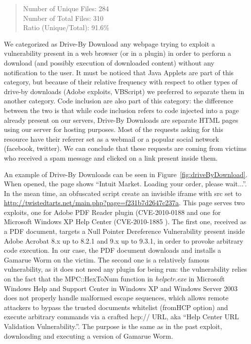 \begin{quote}
Number of Unique Files: 284\\
Number of Total Files: 310\\
Ratio (Unique/Total): 91.6\%
\end{quote}

We categorized as Drive-By Download any webpage trying to exploit a vulnerability present in a web browser (or in a plugin) in order to perform a download (and possibly execution of downloaded content) without any notification to the user. It must be noticed that Java Applets are part of this category, but because of their relative frequency with respect to other types of drive-by downloads (Adobe exploits, VBScript) we preferred to separate them in another category. Code inclusion are also part of this category: the difference between the two is that while code inclusion refers to code injected into a page already present on our servers, Drive-By Downloads are separate HTML pages using our server for hosting purposes.
Most of the requests asking for this resource have their referrer set as a webmail or a popular social network (facebook, twitter). We can conclude that these requests are coming from victims who received a spam message and clicked on a link present inside them.

An example of Drive-By Downloads can be seen in Figure~\ref{fig:driveByDownload}. When opened, the page shows ``Intuit Market. Loading your order, please wait...''. In the mean time, an obfuscated script create an invisible iframe with src set to \url{http://twistedtarts.net/main.php?page=f231b7d2647c237a}. This page serves two exploits, one for Adobe PDF Reader plugin (CVE-2010-0188 \cite{CVE-2010-0188} and one for Microsoft Windows XP Help Center (CVE-2010-1885 \cite{CVE-2010-1885}). The first one, received as a PDF document, targets a Null Pointer Dereference Vulnerability present inside Adobe Acrobat 8.x up to 8.2.1 and 9.x up to 9.3.1, in order to provoke arbitrary code execution. In our case, the PDF document downloads and installs a Gamarue Worm on the victim. The second one is a relatively famous vulnerability, as it does not need any plugin for being run: the vulnerability relies on the fact that the MPC::HexToNum function in \emph{helpctr.exe} in Microsoft Windows Help and Support Center in Windows XP and Windows Server 2003 does not properly handle malformed escape sequences, which allows remote attackers to bypass the trusted documents whitelist (fromHCP option) and execute arbitrary commands via a crafted hcp:// URL, aka ``Help Center URL Validation Vulnerability.''. The purpose is the same as in the past exploit, downloading and executing a version of Gamarue Worm.

